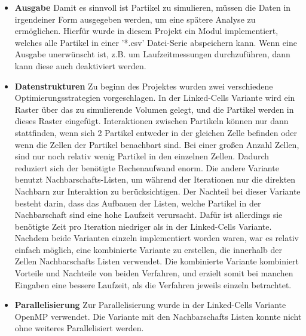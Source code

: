 \documentclass[
	12pt,
	a4paper,
	BCOR10mm,
	DIV14,
	headsepline,
]{scrreprt}
\begin{document}
\begin{itemize}
		\item \textbf{Ausgabe} Damit es sinnvoll ist Partikel zu simulieren, müssen die Daten in irgendeiner Form ausgegeben werden, um eine spätere Analyse zu ermöglichen. Hierfür wurde in diesem Projekt ein Modul implementiert, welches alle Partikel in einer '*.csv' Datei-Serie abspeichern kann. Wenn eine Ausgabe unerwünscht ist, z.B. um Laufzeitmessungen durchzuführen, dann kann diese auch deaktiviert werden.
		\item \textbf{Datenstrukturen} Zu beginn des Projektes wurden zwei verschiedene Optimierungsstrategien vorgeschlagen. In der Linked-Cells Variante wird ein Raster über das zu simulierende Volumen gelegt, und die Partikel werden in dieses Raster eingefügt. Interaktionen zwischen Partikeln können nur dann stattfinden, wenn sich 2 Partikel entweder in der gleichen Zelle befinden oder wenn die Zellen der Partikel benachbart sind. Bei einer großen Anzahl Zellen, sind nur noch relativ wenig Partikel in den einzelnen Zellen. Dadurch reduziert sich der benötigte Rechenaufwand enorm. Die andere Variante benutzt Nachbarschafts-Listen, um während der Iterationen nur die direkten Nachbarn zur Interaktion zu berücksichtigen. Der Nachteil bei dieser Variante besteht darin, dass das Aufbauen der Listen, welche Partikel in der Nachbarschaft sind eine hohe Laufzeit verursacht. Dafür ist allerdings sie benötigte Zeit pro Iteration niedriger als in der Linked-Cells Variante. Nachdem beide Varianten einzeln implementiert worden waren, war es relativ einfach möglich, eine kombinierte Variante zu erstellen, die innerhalb der Zellen Nachbarschafts Listen verwendet. Die kombinierte Variante kombiniert Vorteile und Nachteile von beiden Verfahren, und erzielt somit bei manchen Eingaben eine bessere Laufzeit, als die Verfahren jeweils einzeln betrachtet.
		\item \textbf{Parallelisierung} Zur Parallelisierung wurde in der Linked-Cells Variante OpenMP verwendet. Die Variante mit den Nachbarschafts Listen konnte nicht ohne weiteres Parallelisiert werden.
	\end{itemize}
\end{document}
